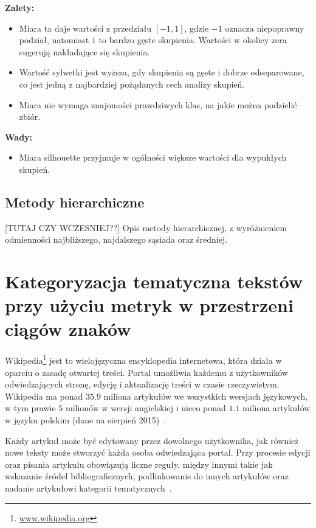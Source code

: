 \documentclass{praca1}
\begin{document}
\textbf{Zalety:}
\begin{itemize}
\item Miara ta daje wartości z przedziału $[-1, 1]$, gdzie $-1$ oznacza niepoprawny podział, natomiast $1$ to bardzo gęste skupienia. Wartości w okolicy zera sugerują nakładające się skupienia.
\item Wartość sylwetki jest wyższa, gdy skupienia są gęste i dobrze odseparowane, co jest jedną z najbardziej pożądanych cech analizy skupień.
\item Miara nie wymaga znajomości prawdziwych klas, na jakie można podzielić zbiór.
\end{itemize}


\textbf{Wady:}
\begin{itemize}
\item Miara silhouette przyjmuje w ogólności większe wartości dla wypukłych skupień.
\end{itemize}

\section{Metody hierarchiczne}

[TUTAJ CZY WCZESNIEJ??]
Opis metody hierarchicznej, z wyróżnieniem odmienności najbliższego, najdalszego sąsiada oraz średniej.

\chapter{Kategoryzacja tematyczna tekstów przy użyciu metryk w przestrzeni ciągów znaków}

Wikipedia\footnote{\url{www.wikipedia.org}} jest to wielojęzyczna encyklopedia internetowa, która działa w oparciu o zasadę otwartej treści. Portal umożliwia każdemu z użytkowników odwiedzających stronę, edycję i aktualizację treści w czasie rzeczywistym. Wikipedia ma ponad $35.9$ miliona artykułów we wszystkich wersjach językowych, w tym prawie $5$ milionów w wersji angielskiej i nieco ponad $1.1$ miliona artykułów w języku polskim (dane na sierpień 2015)~\cite{wiki}.

Każdy artykuł może być edytowany przez dowolnego użytkownika, jak również nowe teksty może stworzyć każda osoba odwiedzająca portal. Przy procesie edycji oraz pisania artykułu obowiązują liczne reguły, między innymi takie jak wskazanie źródeł bibliograficznych, podlinkowanie do innych artykułów oraz nadanie artykułowi kategorii tematycznych~\cite{wiki}. 
\end{document}
